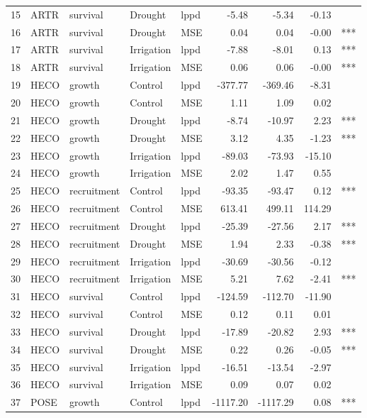 \begin{longtable}{rllllrrrl}
  15 & ARTR & survival & Drought & lppd & -5.48 & -5.34 & -0.13 &  \\ 
  16 & ARTR & survival & Drought & MSE & 0.04 & 0.04 & -0.00 & *** \\ 
  17 & ARTR & survival & Irrigation & lppd & -7.88 & -8.01 & 0.13 & *** \\ 
  18 & ARTR & survival & Irrigation & MSE & 0.06 & 0.06 & -0.00 & *** \\ 
  19 & HECO & growth & Control & lppd & -377.77 & -369.46 & -8.31 &  \\ 
  20 & HECO & growth & Control & MSE & 1.11 & 1.09 & 0.02 &  \\ 
  21 & HECO & growth & Drought & lppd & -8.74 & -10.97 & 2.23 & *** \\ 
  22 & HECO & growth & Drought & MSE & 3.12 & 4.35 & -1.23 & *** \\ 
  23 & HECO & growth & Irrigation & lppd & -89.03 & -73.93 & -15.10 &  \\ 
  24 & HECO & growth & Irrigation & MSE & 2.02 & 1.47 & 0.55 &  \\ 
  25 & HECO & recruitment & Control & lppd & -93.35 & -93.47 & 0.12 & *** \\ 
  26 & HECO & recruitment & Control & MSE & 613.41 & 499.11 & 114.29 &  \\ 
  27 & HECO & recruitment & Drought & lppd & -25.39 & -27.56 & 2.17 & *** \\ 
  28 & HECO & recruitment & Drought & MSE & 1.94 & 2.33 & -0.38 & *** \\ 
  29 & HECO & recruitment & Irrigation & lppd & -30.69 & -30.56 & -0.12 &  \\ 
  30 & HECO & recruitment & Irrigation & MSE & 5.21 & 7.62 & -2.41 & *** \\ 
  31 & HECO & survival & Control & lppd & -124.59 & -112.70 & -11.90 &  \\ 
  32 & HECO & survival & Control & MSE & 0.12 & 0.11 & 0.01 &  \\ 
  33 & HECO & survival & Drought & lppd & -17.89 & -20.82 & 2.93 & *** \\ 
  34 & HECO & survival & Drought & MSE & 0.22 & 0.26 & -0.05 & *** \\ 
  35 & HECO & survival & Irrigation & lppd & -16.51 & -13.54 & -2.97 &  \\ 
  36 & HECO & survival & Irrigation & MSE & 0.09 & 0.07 & 0.02 &  \\ 
  37 & POSE & growth & Control & lppd & -1117.20 & -1117.29 & 0.08 & *** \\ 

\end{longtable}
